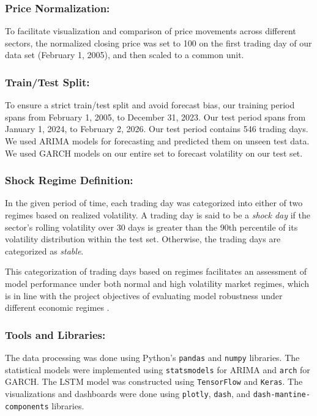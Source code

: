 \documentclass[12pt]{article}
\begin{document}
\subsubsection{Price Normalization:}
To facilitate visualization and comparison of price movements across different sectors, the normalized closing price was set to 100 on the first trading day of our data set (February 1, 2005), and then scaled to a common unit.

\subsubsection{Train/Test Split:}
To ensure a strict train/test split and avoid forecast bias, our training period spans from February 1, 2005, to December 31, 2023. Our test period spans from January 1, 2024, to February 2, 2026. Our test period contains 546 trading days. We used ARIMA models for forecasting and predicted them on unseen test data. We used GARCH models on our entire set to forecast volatility on our test set.

\subsubsection{Shock Regime Definition:} 
In the given period of time, each trading day was categorized into either of two regimes based on realized volatility. A trading day is said to be a \textit{shock day} if the sector’s rolling volatility over 30 days is greater than the 90th percentile of its volatility distribution within the test set. Otherwise, the trading days are categorized as \textit{stable}.

\noindent This categorization of trading days based on regimes facilitates an assessment of model performance under both normal and high volatility market regimes, which is in line with the project objectives of evaluating model robustness under different economic regimes \cite{progress}.

\subsubsection{Tools and Libraries:}
The data processing was done using Python's \texttt{pandas} and \texttt{numpy} libraries. The statistical models were implemented using \texttt{statsmodels} for ARIMA and \texttt{arch} for GARCH. The LSTM model was constructed using \texttt{TensorFlow} and \texttt{Keras}. The visualizations and dashboards were done using \texttt{plotly}, \texttt{dash}, and \texttt{dash-mantine-components} libraries.
\end{document}
